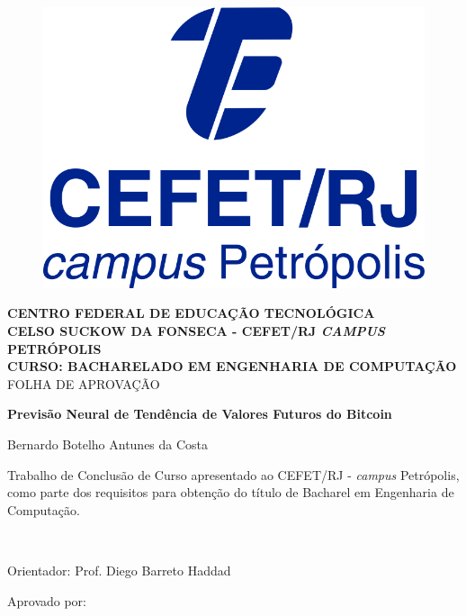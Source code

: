 {\center %


\begin{figure}
\center
\includegraphics[height=0.13\textwidth]{Figs/logoCefetCampusPetropolis.jpg} 
\end{figure}

\begin{center}
{\large \bf CENTRO FEDERAL DE EDUCAÇÃO TECNOLÓGICA} \vspace{1mm} \\
{\large \bf CELSO SUCKOW DA FONSECA - CEFET/RJ \textit{CAMPUS} PETRÓPOLIS} \vspace{1mm} \\
{\large \bf CURSO: BACHARELADO EM ENGENHARIA DE COMPUTAÇÃO}\\
\vspace*{1.2cm}
{\large  FOLHA DE APROVAÇÃO}

\vspace*{1.3cm}
{\large \bf  Previsão Neural de Tendência de Valores Futuros do Bitcoin}\\
\end{center}
\vspace{0.5cm}
\hfill
\begin{flushright}
    Bernardo Botelho Antunes da Costa
	\end{flushright}
\vspace*{0.5cm}
\begin{flushright}
	\begin{minipage}{0.5\textwidth}
		{\normalsize
		Trabalho de Conclusão de Curso apresentado ao  
	 CEFET/RJ -{ {\it campus} Petrópolis}, como parte dos requisitos para obtenção do título de Bacharel em Engenharia de Computação.}
	\end{minipage}\\[0.5cm]
\end{flushright}
\vspace{0.5cm}
\hfill
\begin{flushright}
Orientador: Prof. Diego Barreto Haddad
\end{flushright}

\begin{minipage}{0.9\textwidth}
	\begin{flushleft}
	Aprovado por:
	\end{flushleft}
\end{minipage}\\[1cm]

}

